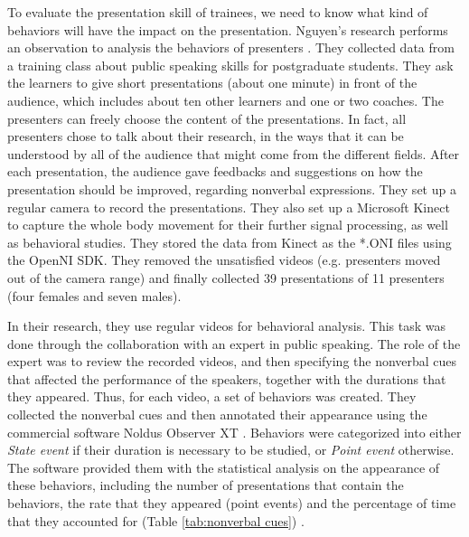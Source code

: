 \par To evaluate the presentation skill of trainees, we need to know what kind of behaviors will have the impact on the presentation. Nguyen's research performs an observation to analysis the behaviors of presenters \cite{nguyen2015intelligent}. They collected data from a training class about public speaking skills for postgraduate students. They ask the learners to give short presentations (about one minute) in front of the audience, which includes about ten other learners and one or two coaches. The presenters can freely choose the content of the presentations. In fact, all presenters chose to talk about their research, in the ways that it can be understood by all of the audience that might come from the different fields. After each presentation, the audience gave feedbacks and suggestions on how the presentation should be improved, regarding nonverbal expressions. They set up a regular camera to record the presentations. They also set up a Microsoft Kinect to capture the whole body movement for their further signal processing, as well as behavioral studies. They stored the data from Kinect as the *.ONI files using the OpenNI SDK. They removed the unsatisfied videos (e.g. presenters moved out of the camera range) and finally collected 39 presentations of 11 presenters (four females and seven males). 
\par In their research, they use regular videos for behavioral analysis. This task was done through the collaboration with an expert in public speaking. The role of the expert was to review the recorded videos, and then specifying the nonverbal cues that affected the performance of the speakers, together with the durations that they appeared. Thus, for each video, a set of behaviors was created. They collected the nonverbal cues and then annotated their appearance using the commercial software Noldus Observer XT \cite{Zimmerman2009}. Behaviors were categorized into either \textit{State event} if their duration is necessary to be studied, or \textit{Point event} otherwise. The software provided them with the statistical analysis on the appearance of these behaviors, including the number of presentations that contain the behaviors, the rate that they appeared (point events) and the percentage of time that they accounted for (Table \ref{tab:nonverbal cues}) \cite{nguyen2015intelligent}.


